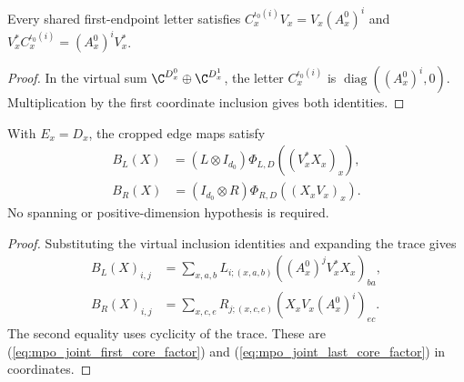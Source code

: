 \begin{lemma}
    \label{thm:mpo_joint_shared_letter_inclusion}
    \leanok
    Every shared first-endpoint letter satisfies
    $C_x^{\iota_0(i)}V_x=V_x(A_x^0)^i$ and
    $V_x^*C_x^{\iota_0(i)}=(A_x^0)^iV_x^*$.
\end{lemma}
\begin{proof}
    \leanok
    In the virtual sum $\C^{D_x^0}\oplus\C^{D_x^1}$, the letter
    $C_x^{\iota_0(i)}$ is $\operatorname{diag}((A_x^0)^i,0)$.
    Multiplication by the first coordinate inclusion gives both identities.
\end{proof}

\begin{lemma}
    \label{thm:mpo_joint_edge_factors}
    \leanok
    With $E_x=D_x$, the cropped edge maps satisfy
    \begin{align}
        B_L(X) & =(L\otimes I_{d_0})\Phi_{L,D}((V_x^*X_x)_x),
        \label{eq:mpo_joint_first_core_factor}
    \end{align}
    \begin{align}
        B_R(X) & =(I_{d_0}\otimes R)\Phi_{R,D}((X_xV_x)_x).
        \label{eq:mpo_joint_last_core_factor}
    \end{align}
    No spanning or positive-dimension hypothesis is required.
\end{lemma}
\begin{proof}
    \leanok
    Substituting the virtual inclusion identities and expanding the trace
    gives
    \begin{align}
        B_L(X)_{i,j}
         & =\sum_{x,a,b}L_{i;(x,a,b)}
        ((A_x^0)^jV_x^*X_x)_{ba},     \\
        B_R(X)_{i,j}
         & =\sum_{x,c,e}R_{j;(x,c,e)}
        (X_xV_x(A_x^0)^i)_{ec}.
    \end{align}
    The second equality uses cyclicity of the trace. These are
    (\ref{eq:mpo_joint_first_core_factor}) and
    (\ref{eq:mpo_joint_last_core_factor}) in coordinates.
\end{proof}

